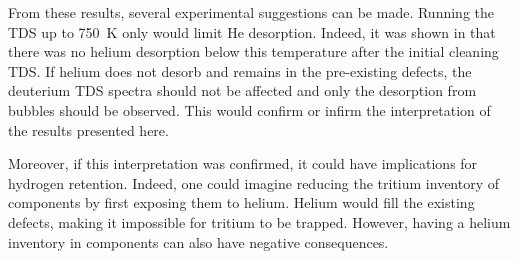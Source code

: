 From these results, several experimental suggestions can be made.
Running the TDS up to \SI{750}{K} only would limit He desorption.
Indeed, it was shown in \cite{ialovega_hydrogen_2020} that there was no helium desorption below this temperature after the initial cleaning TDS.
If helium does not desorb and remains in the pre-existing defects, the deuterium TDS spectra should not be affected and only the desorption from bubbles should be observed.
This would confirm or infirm the interpretation of the results presented here.

Moreover, if this interpretation was confirmed, it could have implications for hydrogen retention.
Indeed, one could imagine reducing the tritium inventory of components by first exposing them to helium.
Helium would fill the existing defects, making it impossible for tritium to be trapped.
However, having a helium inventory in components can also have negative consequences.
